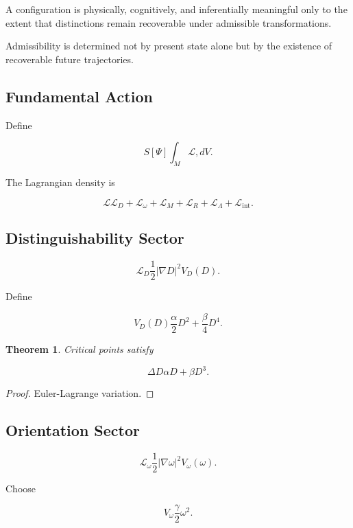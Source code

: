 \documentclass[12pt]{article}
\newtheorem{theorem}{Theorem}[section]
\theoremstyle{remark}
\begin{document}
\begin{axiom}
A configuration is physically, cognitively, and inferentially meaningful only to the extent that distinctions remain recoverable under admissible transformations.
\end{axiom}

\begin{axiom}
Admissibility is determined not by present state alone but by the existence of recoverable future trajectories.
\end{axiom}

\subsection{Fundamental Action}

Define

\[
S[\Psi]
\int_M
\mathcal L
,dV.
\]

The Lagrangian density is

\[
\mathcal L
\mathcal L_D
+
\mathcal L_\omega
+
\mathcal L_M
+
\mathcal L_R
+
\mathcal L_\Lambda
+
\mathcal L_{\mathrm{int}}.
\]

\subsection{Distinguishability Sector}

\[
\mathcal L_D
\frac12
|\nabla D|^2

V_D(D).
\]

Define

\[
V_D(D)
\frac{\alpha}{2}D^2
+
\frac{\beta}{4}D^4.
\]

\begin{theorem}
Critical points satisfy

\[
\Delta D
\alpha D
+
\beta D^3.
\]
\end{theorem}

\begin{proof}
Euler-Lagrange variation.
\end{proof}

\subsection{Orientation Sector}

\[
\mathcal L_\omega
\frac12
|\nabla\omega|^2

V_\omega(\omega).
\]

Choose

\[
V_\omega
\frac{\gamma}{2}\omega^2.
\]
\end{document}

